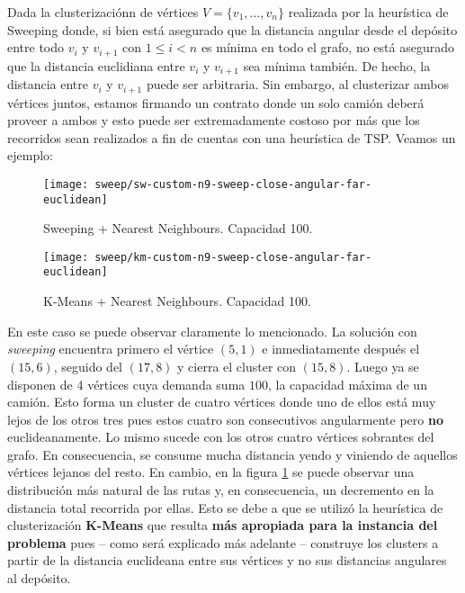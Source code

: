 Dada la clusterizaciónn de vértices $V=\{v_{1}, \dots, v_{n}\}$ realizada por la heurística de Sweeping donde, si bien está asegurado que la distancia angular desde el depósito entre todo $v_{i}$ y $v_{i+1}$ con $1 \leq i < n$ es mínima en todo el grafo, no está asegurado que la distancia euclidiana entre $v_{i}$ y $v_{i+1}$ sea mínima también. De hecho, la distancia entre $v_{i}$ y $v_{i+1}$ puede ser arbitraria. Sin embargo, al clusterizar ambos vértices juntos, estamos firmando un contrato donde un solo camión deberá proveer a ambos y esto puede ser extremadamente costoso por más que los recorridos sean realizados a fin de cuentas con una heurística de TSP. Veamos un ejemplo:

\begin{figure}[H]
	\centering
	\begin{minipage}{0.48\textwidth}
		\centering
		\texttt{[image: sweep/sw-custom-n9-sweep-close-angular-far-euclidean]}
		\caption{\footnotesize Sweeping + Nearest Neighbours. Capacidad 100.}
		\label{fig:sw-custom-n9-sweep-close-angular-far-euclidean}
	\end{minipage}%
	\hspace{0.03\textwidth}
	\begin{minipage}{0.48\textwidth}
		\centering
		\texttt{[image: sweep/km-custom-n9-sweep-close-angular-far-euclidean]}
		\caption{\footnotesize K-Means + Nearest Neighbours. Capacidad 100.}
		\label{fig:km-custom-n9-sweep-close-angular-far-euclidean}
	\end{minipage}%
\end{figure}

En este caso se puede observar claramente lo mencionado. La solución con \textit{sweeping} encuentra primero el vértice $(5, 1)$ e inmediatamente después el $(15, 6)$, seguido del $(17, 8)$ y cierra el cluster con $(15, 8)$. Luego ya se disponen de 4 vértices cuya demanda suma $100$, la capacidad máxima de un camión. Esto forma un cluster de cuatro vértices donde uno de ellos está muy lejos de los otros tres pues estos cuatro son consecutivos angularmente pero \textbf{no} euclideanamente. Lo mismo sucede con los otros cuatro vértices sobrantes del grafo. En consecuencia, se consume mucha distancia yendo y viniendo de aquellos vértices lejanos del resto. En cambio, en la figura \ref{fig:km-custom-n9-sweep-close-angular-far-euclidean} se puede observar una distribución más natural de las rutas y, en consecuencia, un decremento en la distancia total recorrida por ellas. Esto se debe a que se utilizó la heurística de clusterización \textbf{K-Means} que resulta \textbf{más apropiada para la instancia del problema} pues – como será explicado más adelante – construye los clusters a partir de la distancia euclideana entre sus vértices y no sus distancias angulares al depósito.

